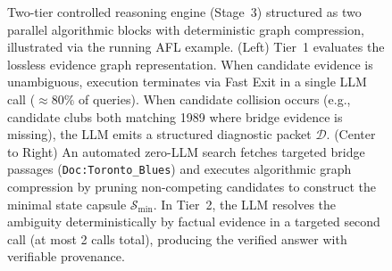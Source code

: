 \begin{figure}[t]
\centering
\resizebox{0.88\linewidth}{!}{}
\vspace{0.5mm}
\caption{Two-tier controlled reasoning engine (Stage~3) structured as two parallel algorithmic blocks with deterministic graph compression, illustrated via the running AFL example. (Left) Tier~1 evaluates the lossless evidence graph representation. When candidate evidence is unambiguous, execution terminates via Fast Exit in a single LLM call ($\approx 80\%$ of queries). When candidate collision occurs (e.g., candidate clubs both matching 1989 where bridge evidence is missing), the LLM emits a structured diagnostic packet $\mathcal{D}$. (Center to Right) An automated zero-LLM search fetches targeted bridge passages (\texttt{Doc:Toronto\_Blues}) and executes algorithmic graph compression by pruning non-competing candidates to construct the minimal state capsule $\mathcal{S}_{\min}$. In Tier~2, the LLM resolves the ambiguity deterministically by factual evidence in a targeted second call (at most 2 calls total), producing the verified answer with verifiable provenance.}
\vspace{-3mm}
\label{fig:two-tier}
\end{figure}
